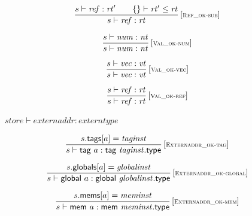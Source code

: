 $$
\begin{array}{@{}c@{}}\displaystyle
\frac{
s \vdash {\mathit{ref}} : {\mathit{rt}'}
 \qquad
\{  \} \vdash {\mathit{rt}'} \leq {\mathit{rt}}
}{
s \vdash {\mathit{ref}} : {\mathit{rt}}
} \, {[\textsc{\scriptsize Ref\_ok{-}sub}]}
\qquad
\end{array}
$$

\vspace{1ex}

$$
\begin{array}{@{}c@{}}\displaystyle
\frac{
s \vdash {\mathit{num}} : {\mathit{nt}}
}{
s \vdash {\mathit{num}} : {\mathit{nt}}
} \, {[\textsc{\scriptsize Val\_ok{-}num}]}
\qquad
\end{array}
$$

$$
\begin{array}{@{}c@{}}\displaystyle
\frac{
s \vdash {\mathit{vec}} : {\mathit{vt}}
}{
s \vdash {\mathit{vec}} : {\mathit{vt}}
} \, {[\textsc{\scriptsize Val\_ok{-}vec}]}
\qquad
\end{array}
$$

$$
\begin{array}{@{}c@{}}\displaystyle
\frac{
s \vdash {\mathit{ref}} : {\mathit{rt}}
}{
s \vdash {\mathit{ref}} : {\mathit{rt}}
} \, {[\textsc{\scriptsize Val\_ok{-}ref}]}
\qquad
\end{array}
$$

\vspace{1ex}

$\boxed{{\mathit{store}} \vdash {\mathit{externaddr}} : {\mathit{externtype}}}$

$$
\begin{array}{@{}c@{}}\displaystyle
\frac{
s{.}\mathsf{tags}{}[a] = {\mathit{taginst}}
}{
s \vdash \mathsf{tag}~a : \mathsf{tag}~{\mathit{taginst}}{.}\mathsf{type}
} \, {[\textsc{\scriptsize Externaddr\_ok{-}tag}]}
\qquad
\end{array}
$$

$$
\begin{array}{@{}c@{}}\displaystyle
\frac{
s{.}\mathsf{globals}{}[a] = {\mathit{globalinst}}
}{
s \vdash \mathsf{global}~a : \mathsf{global}~{\mathit{globalinst}}{.}\mathsf{type}
} \, {[\textsc{\scriptsize Externaddr\_ok{-}global}]}
\qquad
\end{array}
$$

$$
\begin{array}{@{}c@{}}\displaystyle
\frac{
s{.}\mathsf{mems}{}[a] = {\mathit{meminst}}
}{
s \vdash \mathsf{mem}~a : \mathsf{mem}~{\mathit{meminst}}{.}\mathsf{type}
} \, {[\textsc{\scriptsize Externaddr\_ok{-}mem}]}
\qquad
\end{array}
$$


